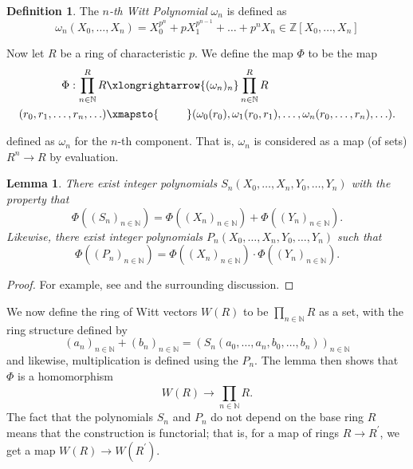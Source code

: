 \documentclass[a4paper]{article}
\newtheorem{lem}[thm]{Lemma}
\theoremstyle{definition}
\newtheorem{defn}[thm]{Definition}
\theoremstyle{remark}
\begin{document}
\begin{defn}
	The \textit{\(n\)-th Witt Polynomial} \(\omega_{n}\) is defined as
	\[
		\omega_{n}(X_{0}, \ldots, X_{n}) = X_{0}^{p^{n}} + pX_{1}^{p^{n-1}} + \ldots + p^{n}X_{n}
        \in \mathbb{Z}[X_{0}, \ldots, X_{n}]
	\] 
    
\end{defn}

\noindent Now let \(R\) be a ring of characteristic \(p\).
We define the map \(\Phi\) to be the map 
\begin{align*}
    \Phi : \prod_{n \in \mathbb{N}}^{R} R  
    &\xlongrightarrow{(\omega_{n})_{n}} 
    \prod_{n \in \mathbb{N}}^{R} R \\
    (r_{0}, r_{1}, \ldots, r_{n}, \ldots) 
    &\xmapsto{\hphantom{(\omega_{n})_{n}}}
    (\omega_{0}(r_{0}), \omega_{1}(r_{0}, r_{1}), 
    \ldots, \omega_{n}(r_{0}, \ldots, r_{n}), \ldots).
\end{align*}

defined as \(\omega_{n}\) for the \(n\)-th component.
That is, \(\omega_{n}\) is considered as a 
map (of sets) \(R^{n} \xrightarrow{} R\) by
evaluation.

\begin{lem}
	There exist integer polynomials 
	\(S_n(X_{0}, \ldots, X_{n}, Y_{0}, \ldots, Y_{n})\) 
	with the property that 
	\[
		\Phi((S_{n})_{n \in \mathbb{N}}) =
		\Phi((X_{n})_{n \in \mathbb{N}}) 
		+ \Phi((Y_{n})_{n \in \mathbb{N}})
	.\] 
	Likewise, there exist integer polynomials 
	\(P_{n}(X_{0}, \ldots, X_{n}, Y_{0}, \ldots, Y_{n})\)
	such that
	\[
		\Phi((P_{n})_{n \in \mathbb{N}}) =
		\Phi((X_{n})_{n \in \mathbb{N}}) 
		\cdot \Phi((Y_{n})_{n \in \mathbb{N}})
	.\] 
\end{lem}

\begin{proof}
	For example, see \cite[Theorem~2.6]{rabinoff-2014-witt-vec} and the 
	surrounding discussion.
\end{proof}

We now define the ring of Witt vectors 
\(W(R)\) to be 
\(\prod_{n \in \mathbb{N}}^{} R \) 
as a set, with the ring structure defined
by 
\[
	(a_{n})_{n \in \mathbb{N}} + 
	(b_{n})_{n \in \mathbb{N}} =
	(S_{n}(a_{0}, \ldots, a_{n}, b_{0}, \ldots, b_{n}))_{n \in \mathbb{N}}
\] 
and likewise, multiplication is defined
using the \(P_{n}\).
The lemma then shows that \(\Phi\) is a homomorphism 
\[
	W(R) \xrightarrow{} \prod_{n \in \mathbb{N}}^{} R 
.\] 
The fact that the polynomials \(S_{n}\) and \(P_{n}\) do not depend on the base
ring \(R\) means that the construction is functorial; that is,
for a map of rings \(R \xrightarrow{} R^{\prime} \), we get a 
map \(W(R) \xrightarrow{} W(R^{\prime})\).
\end{document}
